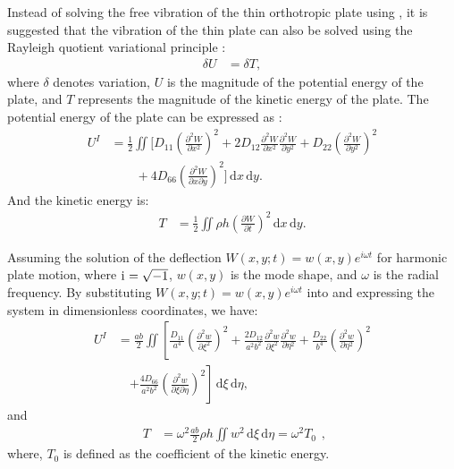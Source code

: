 \documentclass[preprint,12pt,number]{elsarticle}
\newcommand{\ii}{\mathrm{i}\mkern1mu}
\begin{document}
Instead of solving the free vibration of the thin orthotropic plate using , it is suggested that the vibration of the thin plate can also be solved using the Rayleigh quotient variational principle \cite{xing2018overall}:
%
\begin{equation}\label{eq:Rayleigh}
\begin{split}
	\delta U &= \delta T,
\end{split}
\end{equation}
%
where $\delta$ denotes variation, $U$ is the magnitude of the potential energy of the plate, and $T$ represents the magnitude of the kinetic energy of the plate.
The potential energy of the plate can be expressed as \cite{xing2020extended}:
%
\begin{equation}\label{eq:poten_energy}
\begin{split}
	U^{I} &= \frac{1}{2}\iint \Bigg[D_{11}\left(\frac{\partial^2 W}{\partial x^2}\right)^2 + 2D_{12}\frac{\partial^2 W}{\partial x^2}\frac{\partial^2 W}{\partial y^2} + D_{22}\left(\frac{\partial^2 W}{\partial y^2}\right)^2 \\
	&\qquad + 4D_{66}\left(\frac{\partial^2 W}{\partial x \partial y}\right)^2\Bigg] \, \mathrm{d}x \, \mathrm{d}y.
\end{split}
\end{equation}
%
And the kinetic energy is:
%
\begin{equation}\label{eq:kine_energy}
\begin{split}
	T &= \frac{1}{2}\iint \rho h \left(\frac{\partial W}{\partial t}\right)^2 \, \mathrm{d}x \, \mathrm{d}y.
\end{split}
\end{equation}

Assuming the solution of the deflection $ W(x, y; t) = w(x, y) e^{i \omega t} $ for harmonic plate motion, 
where $ \ii = \sqrt{-1} $, $ w(x, y) $ is the mode shape, and $ \omega $ is the radial frequency.  
By substituting $ W(x, y; t) = w(x, y) e^{i \omega t} $ into  and expressing the system in dimensionless coordinates, we have:
%
\begin{equation}\label{eq:poten_energy_mag}
\begin{split}
	U^{I} &= \frac{ab}{2} \iint \left[ \frac{D_{11}}{a^4} \left( \frac{\partial^2 w}{\partial \xi^2} \right)^2 + \frac{2 D_{12}}{a^2 b^2} \frac{\partial^2 w}{\partial \xi^2} \frac{\partial^2 w}{\partial \eta^2} + \frac{D_{22}}{b^4} \left( \frac{\partial^2 w}{\partial \eta^2} \right)^2 \right. \\
	&\quad \left. + \frac{4 D_{66}}{a^2 b^2} \left( \frac{\partial^2 w}{\partial \xi \partial \eta} \right)^2 \right] \, \mathrm{d} \xi \, \mathrm{d} \eta,
\end{split}
\end{equation}
%
and
%
\begin{equation}\label{eq:kine_energy_mag}
\begin{split}
	T &= \omega^2 \frac{ab}{2} \rho h \iint w^2 \, \mathrm{d} \xi \, \mathrm{d} \eta=\omega^2T_0
\end{split},
\end{equation}
%
where, $T_0$ is defined as the coefficient of the kinetic energy.
\end{document}

